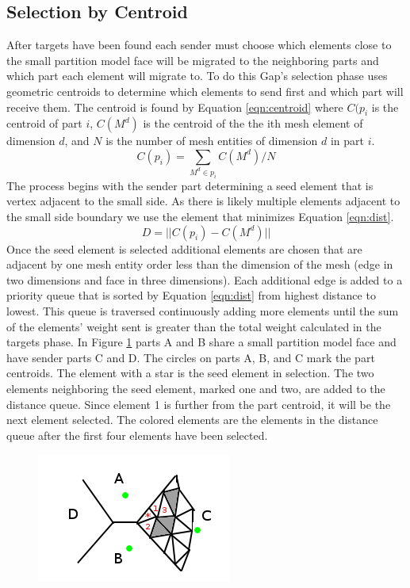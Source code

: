 \documentclass{thesis}
\begin{document}
\subsection{Selection by Centroid}
After targets have been found each sender must choose which elements close 
to the small partition model face will be migrated to the neighboring parts 
and which part each element will migrate to. To do this Gap's selection phase 
uses geometric centroids to determine which elements to send first and which 
part will receive them. The centroid is found by Equation \ref{eqn:centroid} where $C(p_i$ is the centroid of part $i$, $C(M^d)$ is the centroid of the the ith mesh element of dimension $d$, and $N$ is the number of mesh entities of dimension $d$ in part $i$.
\begin{equation}
\label{eqn:centroid}
C(p_i) = \sum_{M^d \in p_i}C(M^d)/N
\end{equation}
The process begins with the sender part determining a seed 
element that is vertex adjacent to the small side. As there is likely 
multiple elements adjacent to the small side boundary we use the element 
that minimizes Equation \ref{eqn:dist}. 
\begin{equation}
\label{eqn:dist}
D = ||C(p_i)-C(M^d)||
\end{equation}
Once the seed element is selected additional elements are chosen that 
are adjacent by one mesh entity order less than the dimension of the mesh 
(edge in two dimensions and face in three dimensions). Each additional edge 
is added to a priority queue that is sorted by Equation \ref{eqn:dist} from 
highest distance to lowest. This queue is traversed continuously adding more 
elements until the sum of the elements' weight sent is greater than the total 
weight calculated in the targets phase. In Figure \ref{fig:selector} parts A 
and B share a small partition model face and have sender parts C and D. The 
circles on parts A, B, and C mark the part centroids. The element with a star 
is the seed element in selection. The two elements neighboring the seed 
element, marked one and two, are added to the distance queue. Since element 
1 is further from the part centroid, it will be the next element selected. 
The colored elements are the elements in the distance queue after the first 
four elements have been selected.

\begin{figure} [!ht]
\centering
\captionsetup{justification=centering,margin=1cm}
\includegraphics[width=.6\textwidth]{selector_example.png}
\caption{\label{fig:selector} \textnormal{}}
\end{figure}
\end{document}
